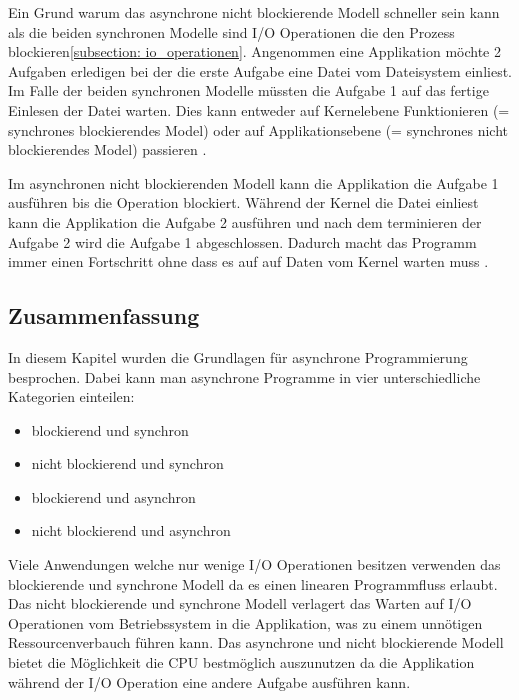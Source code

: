 Ein Grund warum das asynchrone nicht blockierende Modell schneller sein kann als die beiden synchronen Modelle sind I/O Operationen die den Prozess blockieren\ref{subsection: io_operationen}. Angenommen eine Applikation möchte 2 Aufgaben erledigen bei der die erste Aufgabe eine Datei vom Dateisystem einliest. Im Falle der beiden synchronen Modelle müssten die Aufgabe 1 auf das fertige Einlesen der Datei warten. Dies kann entweder auf Kernelebene Funktionieren (= synchrones blockierendes Model) oder auf Applikationsebene (= synchrones nicht blockierendes Model) passieren \cite[]{Pet2015}. 

Im asynchronen nicht blockierenden Modell kann die Applikation die Aufgabe 1 ausführen bis die Operation blockiert. Während der Kernel die Datei einliest kann die Applikation die Aufgabe 2 ausführen und nach dem terminieren der Aufgabe 2 wird die Aufgabe 1 abgeschlossen. Dadurch macht das Programm immer einen Fortschritt ohne dass es auf auf Daten vom Kernel warten muss \cite[]{Pet2015}.


\subsection{Zusammenfassung}

In diesem Kapitel wurden die Grundlagen für asynchrone Programmierung besprochen. Dabei kann man asynchrone Programme in vier unterschiedliche Kategorien einteilen:

\begin{itemize}
  \item blockierend und synchron
  \item nicht blockierend und synchron
  \item blockierend und asynchron
  \item nicht blockierend und asynchron
\end{itemize}    
Viele Anwendungen welche nur wenige I/O Operationen besitzen verwenden das blockierende und synchrone Modell da es einen linearen Programmfluss erlaubt. Das nicht blockierende und synchrone Modell verlagert das Warten auf I/O Operationen vom Betriebssystem in die Applikation, was zu einem unnötigen Ressourcenverbauch führen kann. Das asynchrone und nicht blockierende Modell bietet die Möglichkeit die CPU bestmöglich auszunutzen da die Applikation während der I/O Operation eine andere Aufgabe ausführen kann.